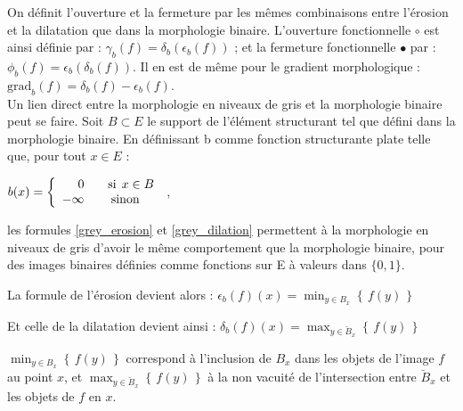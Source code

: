 \vspace{-1.6mm}
On définit l'ouverture et la fermeture par les mêmes combinaisons entre l'érosion et la dilatation que dans la morphologie binaire. L'ouverture fonctionnelle $\circ$ est ainsi définie par : $\gamma_b(f) = \delta_b(\epsilon_b(f))$ ; et la fermeture fonctionnelle $\bullet$ par : $\phi_b(f) = \epsilon_b(\delta_b(f))$.  Il en est de même pour le gradient morphologique : $\text{grad}_b(f)=\delta_b(f)-\epsilon_b(f)$. \\

\vspace{-1.6mm}
Un lien direct entre la morphologie en niveaux de gris et la morphologie binaire peut se faire. Soit $B \subset E$ le support de l'élément structurant tel que défini dans la morphologie binaire. En définissant b comme fonction structurante plate telle que, pour tout $x \in E$ :

\vspace{-3.0mm}
\begin{center}
    $b(x) = \left \{    \begin{array}{rcl} 0 & \hspace{3.2mm} \text{si} \hspace{1.5mm} x \in B \\ -\infty & \text{sinon} \end{array}     \right.$  ,
\end{center}

\vspace{1.2mm}
\noindent les formules \ref{grey_erosion} et \ref{grey_dilation} permettent à la morphologie en niveaux de gris d'avoir le même comportement que la morphologie binaire, pour des images binaires définies comme fonctions sur E à valeurs dans $\{0,1\}$.

\vspace{2.5mm}
\noindent La formule de l'érosion devient alors : \hspace{4mm} $\epsilon_b(f)(x) = \min_{y \in B_{x}} \left \{ \, f(y) \, \right \}$

\noindent Et celle de la dilatation devient ainsi : \hspace{5mm} $\delta_b(f)(x) = \max_{y \in \breve{B}_{x}} \left \{ \, f(y) \, \right \}$

\vspace{2.5mm}
\noindent $\min_{y \in B_{x}} \left \{ \, f(y) \, \right \}$ correspond à l'inclusion de $B_x$ dans les objets de l'image $f$ au point $x$, et $\max_{y \in \breve{B}_{x}} \left \{ \, f(y) \, \right \}$ à la non vacuité de l'intersection entre $\breve{B}_x$ et les objets de $f$ en $x$.


